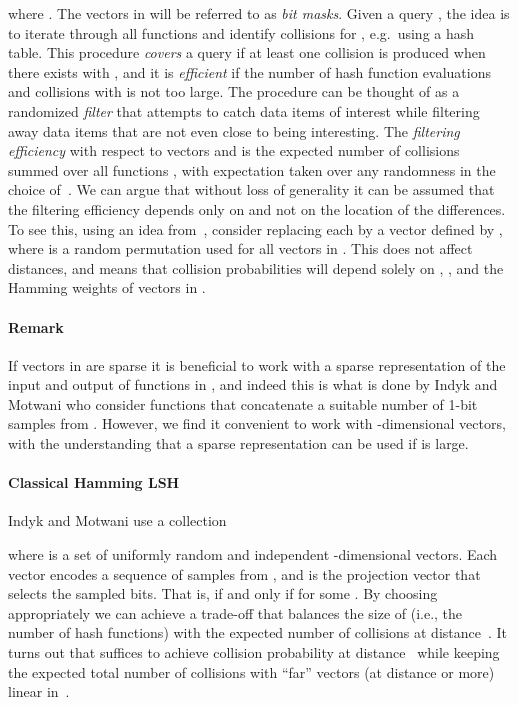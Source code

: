\documentclass[prodmode,acmtalg]{acmsmall}
\begin{document}
where .
The vectors in  will be referred to as \emph{bit masks}.
Given a query , the idea is to iterate through all functions  and identify collisions  for , e.g.~using a hash table.
This procedure \emph{covers} a query  if at least one collision is produced when there exists  with , and it is \emph{efficient} if the number of hash function evaluations and collisions with  is not too large.
The procedure can be thought of as a randomized \emph{filter} that attempts to catch data items of interest while filtering away data items that are not even close to being interesting.
The \emph{filtering efficiency} with respect to vectors  and  is the expected number of collisions  summed over all functions  , with expectation taken over any randomness in the choice of~.
We can argue that without loss of generality it can be assumed that the filtering efficiency depends only on  and not on the location of the differences.
To see this, using an idea from~\cite{Arasu_VLDB06}, consider replacing each  by a vector  defined by , where  is a random permutation used for all vectors in .
This does not affect distances, and means that collision probabilities will depend solely on , , and the Hamming weights of vectors in .

\medskip

\paragraph{Remark} If vectors in  are sparse it is beneficial to work with a sparse representation of the input and output of functions in , and indeed this is what is done by Indyk and Motwani who consider functions that concatenate a suitable number of 1-bit samples from .
However, we find it convenient to work with -dimensional vectors, with the understanding that a sparse representation can be used if  is large. 

\medskip

\paragraph{Classical Hamming LSH}
Indyk and Motwani use a collection 

where  is a set of uniformly random and independent -dimensional vectors.
Each vector  encodes a sequence of  samples from , and  is the projection vector that selects the sampled bits.
That is,  if and only if  for some . 
By choosing  appropriately we can achieve a trade-off that balances the size of  (i.e., the number of hash functions) with the expected number of collisions at distance~.
It turns out that  suffices to achieve collision probability  at distance~ while keeping the expected total number of collisions with ``far'' vectors (at distance  or more) linear in~.
\end{document}
